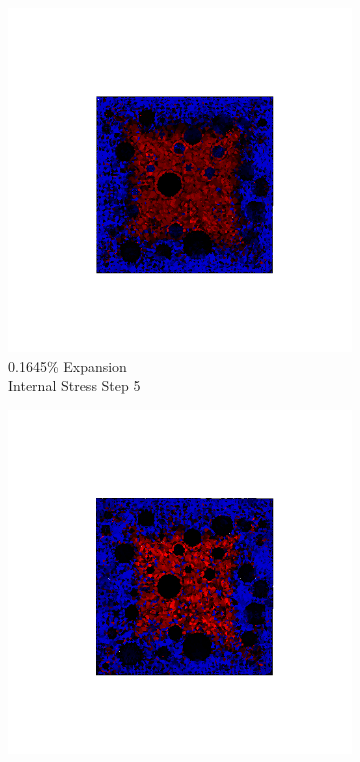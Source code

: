 \begin{figure}[ht!]
\centering
    \begin{subfigure}{.25\textwidth}
      \centering
      \includegraphics[width=1.0\linewidth]{Files/exp_3D/DEF/A15X0C_1_s5.png}
      \caption{0.1645\% Expansion\\Internal Stress Step 5}
    \end{subfigure}%
    \begin{subfigure}{.25\textwidth}
      \centering
      \includegraphics[width=1.0\linewidth]{Files/exp_3D/DEF/A15X0C_1_s10.png}

\end{subfigure}
\end{figure}

